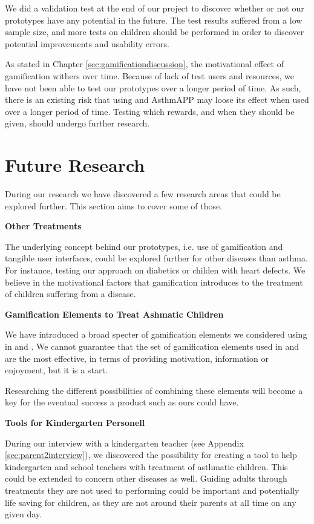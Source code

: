 We did a validation test at the end of our project to discover whether or not our prototypes have any potential in the future. The test results suffered from a low sample size, and more tests on children should be performed in order to discover potential improvements and usability errors. 

As stated in Chapter \ref{sec:gamificationdiscussion}, the motivational effect of gamification withers over time. Because of lack of test users and resources, we have not been able to test our prototypes over a longer period of time. As such, there is an existing risk that using \buddy{} and AsthmAPP may loose its effect when used over a longer period of time. Testing which rewards, and when they should be given, should undergo further research.   

\section{Future Research}
\label{sec:futureresearch}

During our research we have discovered a few research areas that could be explored further. This section aims to cover some of those. 

\textbf{Other Treatments}

The underlying concept behind our prototypes, i.e. use of gamification and tangible user interfaces, could be explored further for other diseases than asthma. For instance, testing our approach on diabetics or childen with heart defects. We believe in the motivational factors that gamification introduces to the treatment of children suffering from a disease. 

\clearpage{}

\textbf{Gamification Elements to Treat Ashmatic Children}

We have introduced a broad specter of gamification elements we considered using in \app{} and \ab{}. We cannot guarantee that the set of gamification elements used in \app{} and \ab{} are the most effective, in terms of providing motivation, information or enjoyment, but it is a start. 

Researching the different possibilities of combining these elements will become a key for the eventual success a product such as ours could have.    


\textbf{Tools for Kindergarten Personell}

During our interview with a kindergarten teacher (see Appendix \ref{sec:parent2interview}), we discovered the possibility for creating a tool to help kindergarten and school teachers with treatment of asthmatic children. This could be extended to concern other diseases as well. Guiding adults through treatments they are not used to performing could be important and potentially life saving for children, as they are not around their parents at all time on any given day.    

